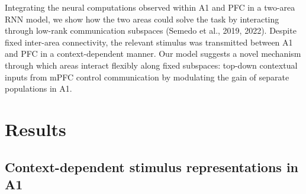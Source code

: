 \documentclass[12pt]{article}
\begin{document}
Integrating the neural computations observed within A1 and PFC in a two-area RNN model, we show how the two areas could solve the task by interacting through low-rank communication subspaces (Semedo et al., 2019, 2022). Despite fixed inter-area connectivity, the relevant stimulus was transmitted between A1 and PFC in a context-dependent manner. Our model suggests a novel mechanism through which areas interact flexibly along fixed subspaces: top-down contextual inputs from mPFC control communication by modulating the gain of separate populations in A1.


\section*{Results}

\subsection*{Context-dependent stimulus representations in A1}
\end{document}
